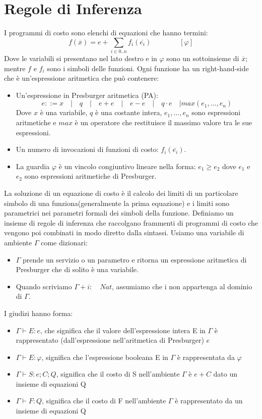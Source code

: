 \documentclass[../../main.tex]{subfiles}
\begin{document}
\section{Regole di Inferenza}
\label{sec:inference_rule}
I programmi di costo sono elenchi di equazioni che hanno termini:
$$f(\overline{x} ) = e + \sum_{i \in 0..n} f_i (\overline{e_i}) \quad \quad \quad \quad[\varphi ]$$
Dove le variabili si presentano nel lato destro e in $\varphi $ sono un sottoinsieme di $\overline{x}$; mentre $f$ e $f_i$ sono i simboli delle funzioni.
Ogni funzione ha un right-hand-side che è un'espressione aritmetica che può contenere:
\begin{itemize}
    \item Un'espressione in Presburger aritmetica (PA)\autocite{DBLP:journals/corr/Haase14}:
    $$e ::= x \quad | \quad q \quad | \quad e + e \quad | \quad e - e \quad | \quad q \cdot e \quad |  max(e_1,\dots,e_n)$$
    Dove $x$ è una variabile, $q$ è una costante intera, $e_1,\dots,e_n$ sono espressioni aritmetiche e $max$ è un operatore che restituisce il massimo valore tra le sue espressioni.
    \item Un numero di invocazioni di funzioni di costo: $f_i (\overline{e_i})$.
    \item La guardia $\varphi$ è un vincolo congiuntivo lineare nella forma: $e_1 \geq e_2$ dove $e_1$ e $e_2$ sono espressioni aritmetiche di Presburger.
\end{itemize} 

La soluzione di un equazione di costo è il calcolo dei limiti di un particolare simbolo di una funziona(generalmente la prima equazione) e i limiti sono parametrici nei parametri formali dei simboli della funzione.
Definiamo un insieme di regole di inferenza che raccolgano frammenti di programmi di costo che vengono poi combinati in modo diretto dalla sintassi.
Usiamo una variabile di ambiente $ \varGamma $ come dizionari:
\begin{itemize}
    \item $\varGamma$ prende un servizio o un parametro e ritorna un espressione aritmetica di Presburger che di solito è una variabile.
    \item Quando scriviamo $\varGamma + i : \quad Nat $, assumiamo che i non appartenga al dominio di $\varGamma$.
\end{itemize}
I giudizi hanno forma:
\begin{itemize}
    \item $\varGamma \vdash E: e$, che significa che il valore dell'espressione intera E in $\varGamma$ è rappresentato (dall'espressione nell'aritmetica di Presburger) $e$
    \item $\varGamma \vdash E : \varphi$, significa che l'espressione booleana E in $\varGamma$ è rappresentata da $\varphi$
    \item $\varGamma \vdash S : e ; C; Q $, significa che il costo di S nell'ambiente $\varGamma$ è $e + C$ dato un insieme di equazioni Q
    \item $\varGamma \vdash F : Q$, significa che il costo di F nell'ambiente $\varGamma$ è rappresentato da un insieme di equazioni Q
\end{itemize}
\end{document}
